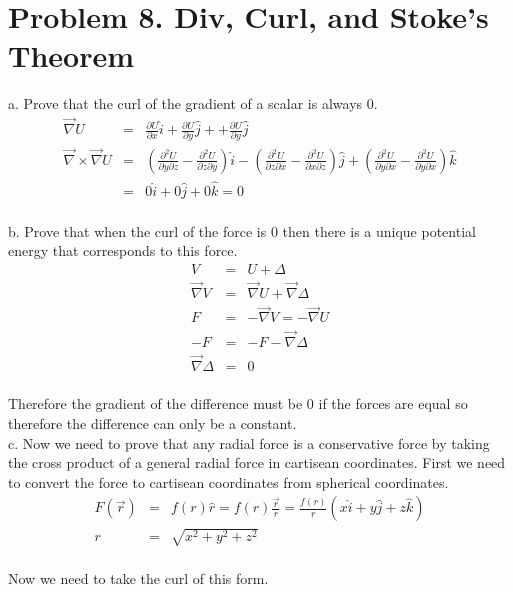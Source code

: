 \documentclass[11pt]{amsart}
\begin{document}
\section{Problem 8. Div, Curl, and Stoke's Theorem}
a. Prove that the curl of the gradient of a scalar is always 0. \\
\begin{eqnarray*}
\vec{\nabla}U &=& \frac{\partial{U}}{\partial{x}}\hat{i}+\frac{\partial{U}}{\partial{y}}\hat{j} ++\frac{\partial{U}}{\partial{y}}\hat{j}  \\
\vec{\nabla} \times \vec{\nabla}U &=& (\frac{\partial^{2}{U}}{\partial{y}\partial{z}}-\frac{\partial^{2}{U}}{\partial{z}\partial{y}})\hat{i}-(\frac{\partial^{2}{U}}{\partial{z}\partial{x}}-\frac{\partial^{2}{U}}{\partial{x}\partial{z}})\hat{j}+(\frac{\partial^{2}{U}}{\partial{y}\partial{x}}-\frac{\partial^{2}{U}}{\partial{y}\partial{x}})\hat{k} \\
&=& 0\hat{i}+0\hat{j}+0\hat{k} =0 
\end{eqnarray*} \\
b. Prove that when the curl of the force is 0 then there is a unique potential energy that corresponds to this force. \\
\begin{eqnarray*}
V  &=& U+\Delta \\
\vec{\nabla}V &=& \vec{\nabla}U + \vec{\nabla}\Delta \\
F &=& -\vec{\nabla}V  = -\vec{\nabla}U \\
-F &=& -F -\vec{\nabla}\Delta \\
\vec{\nabla}\Delta &=& 0 
\end{eqnarray*} \\
Therefore the gradient of the difference must be 0 if the forces are equal so therefore the difference can only be a constant. \\
c. Now we need to prove that any radial force is a conservative force by taking the cross product of a general radial force in cartisean coordinates. First we need to convert the force to cartisean coordinates from spherical coordinates. \\ 
\begin{eqnarray*}
F(\vec{r}) &=& f(r)\hat{r} = f(r)\frac{\vec{r}}{r} = \frac{f(r)}{r}(x\hat{i}+y\hat{j}+z\hat{k}) \\
r &=& \sqrt{x^{2}+y^{2}+z^{2}}
\end{eqnarray*} \\
Now we need to take the curl of this form. \\
\end{document}

